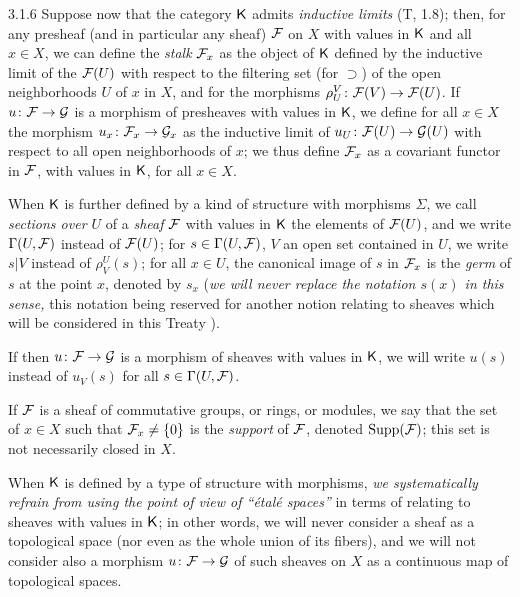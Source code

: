 \begin{env}{3.1.6}
\label{env-0.3.1.6}
Suppose now that the category $\mathsf{K}$ admits \emph{inductive limits} (T, 1.8);
then, for any presheaf (and in particular any sheaf) $\mathcal{F}$ on $X$ with
values in $\mathsf{K}$ and all $x\in X$, we can define the \emph{stalk} $\mathcal{F}_x$ as the object of $\mathsf{K}$ defined
by the inductive limit of the $\mathcal{F}(U)$ with respect to the filtering set
(for $\supset$) of the open neighborhoods $U$ of $x$ in $X$, and for the morphisms $\rho_U^V\colon\mathcal{F}(V)\to\mathcal{F}(U)$.
If $u\colon\mathcal{F}\to\mathcal{G}$ is a morphism of presheaves with values in $\mathsf{K}$, we define for all
$x\in X$ the morphism $u_x\colon\mathcal{F}_x\to\mathcal{G}_x$ as the inductive limit of $u_U\colon\mathcal{F}(U)\to\mathcal{G}(U)$ with respect to all
open neighborhoods of $x$; we thus define $\mathcal{F}_x$ as a covariant functor in $\mathcal{F}$, with values in $\mathsf{K}$, for
all $x\in X$.

When $\mathsf{K}$ is further defined by a kind of structure with morphisms $\Sigma$,
we call \emph{sections over $U$} of a \emph{sheaf} $\mathcal{F}$ with values in $\mathsf{K}$ the elements
of $\mathcal{F}(U)$, and we write $\Gamma(U,\mathcal{F})$ instead of $\mathcal{F}(U)$; for $s\in\Gamma(U,\mathcal{F})$, $V$ an open set
contained in $U$, we write $s|V$ instead of $\rho_V^U(s)$; for all $x\in U$, the canonical image
of $s$ in $\mathcal{F}_x$ is the \emph{germ} of $s$ at the point $x$, denoted by $s_x$ (\emph{we will never replace
the notation $s(x)$ in this sense,} this notation being reserved for another notion relating to sheaves
which will be considered in this Treaty ).

If then $u\colon\mathcal{F}\to\mathcal{G}$ is a morphism of sheaves with values in $\mathsf{K}$, we will write $u(s)$
instead of $u_V(s)$ for all $s\in\Gamma(U,\mathcal{F})$.

If $\mathcal{F}$ is a sheaf of commutative groups, or rings, or modules, we say
that the set of $x\in X$ such that $\mathcal{F}_x\neq\{0\}$ is the \emph{support} of $\mathcal{F}$, denoted
$\operatorname{Supp}(\mathcal{F})$; this set is not necessarily closed in $X$.

When $\mathsf{K}$ is defined by a type of structure with morphisms, \emph{we
systematically refrain from using the point of view of ``{\'e}tal{\'e} spaces''} in terms of
relating to sheaves with values in $\mathsf{K}$; in other words, we will never consider
a sheaf as a topological space (nor even as the whole union of its
fibers), and we will not consider also a morphism $u\colon\mathcal{F}\to\mathcal{G}$ of such sheaves
on $X$ as a continuous map of topological spaces.
\end{env}

